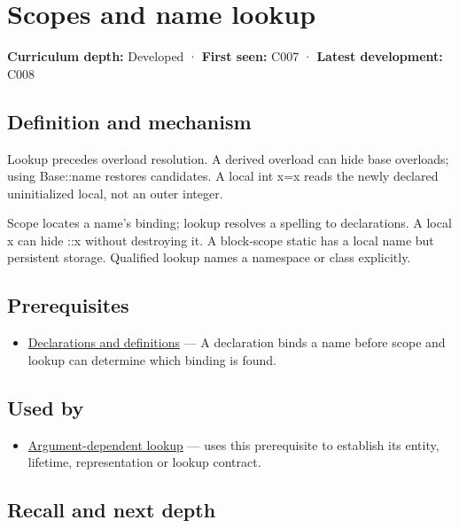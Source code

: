 \hypertarget{appendix-b12b31759da1}{}
\section{Scopes and name lookup}\label{appendix-b12b31759da1-scopes-and-name-lookup}

\textbf{Curriculum depth:} Developed · \textbf{First seen:} C007 · \textbf{Latest development:} C008

\subsection{Definition and mechanism}\label{appendix-b12b31759da1-definition-and-mechanism}

Lookup precedes overload resolution. A derived overload can hide base overloads; using Base::name restores candidates. A local int x=x reads the newly declared uninitialized local, not an outer integer.

Scope locates a name's binding; lookup resolves a spelling to declarations. A local x can hide ::x without destroying it. A block-scope static has a local name but persistent storage. Qualified lookup names a namespace or class explicitly.

\subsection{Prerequisites}\label{appendix-b12b31759da1-prerequisites}

\begin{itemize}
\tightlist
\item
  \hyperref[appendix-2e4d494c2d94]{Declarations and definitions} --- A declaration binds a name before scope and lookup can determine which binding is found.
\end{itemize}

\subsection{Used by}\label{appendix-b12b31759da1-used-by}

\begin{itemize}
\tightlist
\item
  \hyperref[appendix-7863714aa97f]{Argument-dependent lookup} --- uses this prerequisite to establish its entity, lifetime, representation or lookup contract.
\end{itemize}

\subsection{Recall and next depth}\label{appendix-b12b31759da1-recall-and-next-depth}

